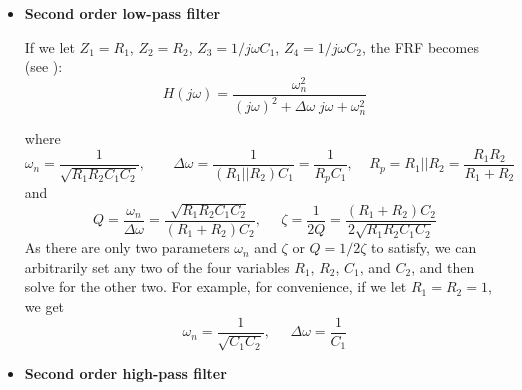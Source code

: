 \begin{itemize}
\item {\bf Second order low-pass filter}
  
  If we let $Z_1=R_1$, $Z_2=R_2$, $Z_3=1/j\omega C_1$, $Z_4=1/j\omega C_2$, 
  the FRF becomes (see
  ):
  \[
  H(j\omega)=\frac{\omega_n^2}{(j\omega)^2+\Delta\omega\;j\omega+\omega_n^2} 
  \]
  \begin{comment}
  \begin{eqnarray}
    H&=&\frac{1/(j\omega)^2C_1C_2}
    {R_1R_2+(R_1+R_2)/j\omega C_1+1/(j\omega)^2C_1C_2}
    \nonumber \\
    &=&\frac{1/R_1R_2C_1C_2}{(j\omega)^2+j\omega(R_1+R_2)/R_1R_2C_1+1/R_1R_2C_1C_2}
    \nonumber \\
    &=&\frac{1/R_1R_2C_1C_2}{(j\omega)^2+j\omega/R_pC_1+1/R_1R_2C_1C_2}
    \nonumber \\
    &=&\frac{\omega_n^2}{(j\omega)^2+2\zeta\omega_n\;j\omega+\omega_n^2} 
    =\frac{\omega_n^2}{(j\omega)^2+\omega_n/Q \;j\omega+\omega_n^2}
    =\frac{\omega_n^2}{(j\omega)^2+\Delta\omega\;j\omega+\omega_n^2} 
    \nonumber
  \end{eqnarray}
  \end{comment}
  where
  \[
  \omega_n=\frac{1}{\sqrt{R_1R_2C_1C_2}},\;\;\;\;\;\;\;
  \Delta\omega=\frac{1}{(R_1||R_2)C_1}=\frac{1}{R_pC_1},\;\;\;\;
  R_p=R_1||R_2=\frac{R_1R_2}{R_1+R_2}
  \]
  and
  \[
  Q=\frac{\omega_n}{\Delta\omega}=\frac{\sqrt{R_1R_2C_1C_2}}{(R_1+R_2)C_2},
  \;\;\;\;\;
  \zeta=\frac{1}{2Q}=\frac{(R_1+R_2)C_2}{2\sqrt{R_1R_2C_1C_2}}
  \]
  As there are only two parameters $\omega_n$ and $\zeta$ or $Q=1/2\zeta$ 
  to satisfy, we can arbitrarily set any two of the four variables $R_1$, 
  $R_2$, $C_1$, and $C_2$, and then solve for the other two. For example, 
  for convenience, if we let $R_1=R_2=1$, we get
  \[
  \omega_n=\frac{1}{\sqrt{C_1C_2}},\;\;\;\;\;\Delta\omega=\frac{1}{C_1}
  \]
  \begin{comment}
    \[
    \zeta=\sqrt{\frac{C_2}{C_1}}
    \]
    Solving these we get
    \[
    C_1=\frac{1}{\omega_n\zeta},\;\;\;\;\;\;C_2=\frac{\zeta}{\omega_n}
    \]
  \end{comment}

\item {\bf Second order high-pass filter}
    

\end{itemize}
